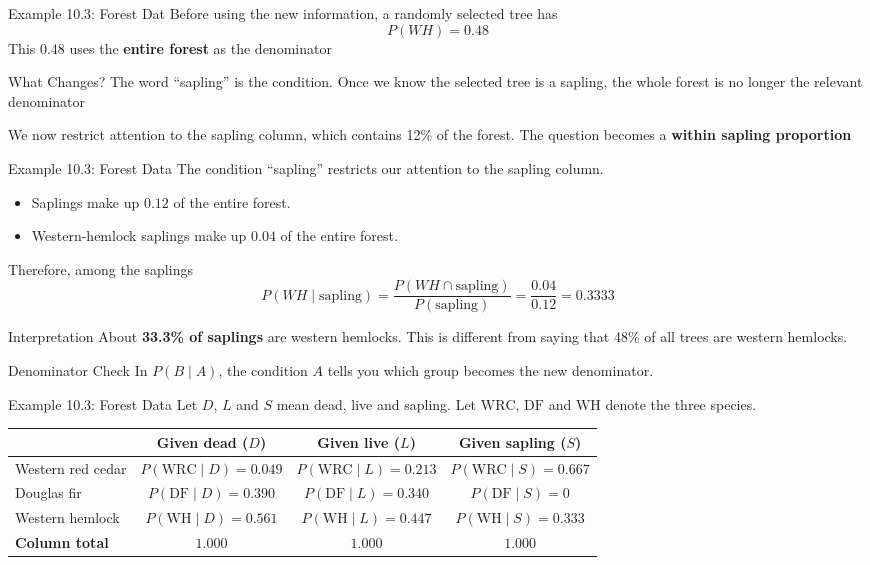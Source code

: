 \documentclass[aspectratio=169]{beamer}
\begin{document}
\begin{frame}{Example 10.3: Forest Dat}
Before using the new information, a randomly selected tree has
$$P(WH)=0.48$$
This 0.48 uses the \textbf{entire forest} as the denominator
\vspace{0.2cm}
\begin{block}{What Changes?}
The word ``sapling'' is the condition. Once we know the selected tree is a sapling, the whole forest is no longer the relevant denominator
\end{block}
\vspace{0.15cm}
We now restrict attention to the sapling column, which contains 12\% of the forest. The question becomes a \textbf{within sapling proportion}
\end{frame}

\begin{frame}{Example 10.3: Forest Data}
The condition ``sapling'' restricts our attention to the sapling column.
\begin{itemize}
	\item Saplings make up $0.12$ of the entire forest.
    	\item Western-hemlock saplings make up $0.04$ of the entire forest.
\end{itemize}
Therefore, among the saplings
$$P(WH\mid \text{sapling}) =\frac{P(WH\cap\text{sapling})}{P(\text{sapling})} =\frac{0.04}{0.12} =\mathbf{0.3333}$$
  
\begin{block}{Interpretation}
About \textbf{33.3\% of saplings} are western hemlocks. This is different from saying that 48\% of all trees are western hemlocks.
\end{block}
\begin{alertblock}{Denominator Check}
In $P(B\mid A)$, the condition $A$ tells you which group becomes the new denominator.
\end{alertblock}
\end{frame}

\begin{frame}{Example 10.3: Forest Data}
Let $D$, $L$ and $S$ mean dead, live and sapling. Let $\mathrm{WRC}$, $\mathrm{DF}$ and $\mathrm{WH}$ denote the three species.
\begin{table}
\centering
\small
\begin{tabular}{lccc}
\toprule
& \textbf{Given dead ($D$)} & \textbf{Given live ($L$)}
& \textbf{Given sapling ($S$)} \\
\midrule
Western red cedar
& $P(\mathrm{WRC}\mid D)=0.049$
& $P(\mathrm{WRC}\mid L)=0.213$
& $P(\mathrm{WRC}\mid S)=0.667$ \\[0.12cm]
Douglas fir
& $P(\mathrm{DF}\mid D)=0.390$
& $P(\mathrm{DF}\mid L)=0.340$
& $P(\mathrm{DF}\mid S)=0$ \\[0.12cm]
Western hemlock
& $P(\mathrm{WH}\mid D)=0.561$
& $P(\mathrm{WH}\mid L)=0.447$
& $P(\mathrm{WH}\mid S)=0.333$ \\
\midrule
\textbf{Column total} & $\mathbf{1.000}$ & $\mathbf{1.000}$
& $\mathbf{1.000}$ \\
\bottomrule
\end{tabular}
\end{table}
\end{frame}
\end{document}
